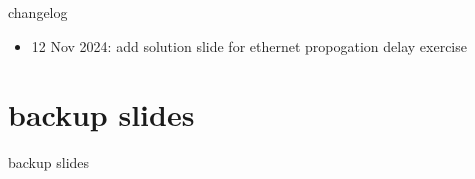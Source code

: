 \date{}
\title{}
\date{}
\usepackage{pgfplots}
\pgfplotsset{compat=1.14}

\begin{frame}
    \titlepage
\end{frame}

{\changelogmode
\begin{frame}{changelog}
\begin{itemize}
\item 12 Nov 2024: add solution slide for ethernet propogation delay exercise
\end{itemize}
\end{frame}
}



\section{backup slides}
\begin{frame}{backup slides}
\end{frame}


